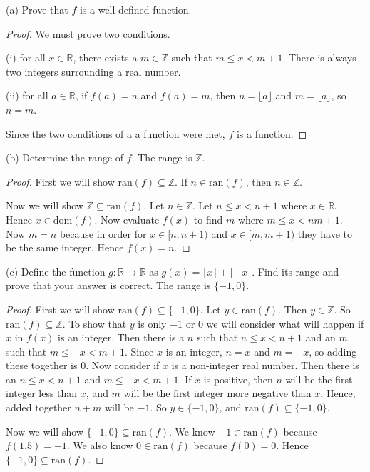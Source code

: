 \documentclass[12pt]{article}
\begin{document}
\begin{enumerate}
		 (a) Prove that $f$ is a well defined function.
		 
		 \begin{proof}
		 	We must prove two conditions.
		 	
		 	(i) for all $x\in\mathbb{R}$, there exists a $m\in\mathbb{Z}$ such that $m\leq x<m+1$. There is always two integers surrounding a real number.
		 	
		 	(ii) for all $a\in\mathbb{R}$, if $f(a)=n$ and $f(a)=m$, then $n=\lfloor a\rfloor$ and $m=\lfloor a\rfloor$, so $n=m$.
		 	
		 	Since the two conditions of a a function were met, $f$ is a function.
		 \end{proof}
	 
	 	\newpage
	 
		(b) Determine the range of $f$.
		The range is $\mathbb{Z}$.
		\begin{proof}
			First we will show $\text{ran}(f)\subseteq\mathbb{Z}$. If $n\in\text{ran}(f)$, then $n\in\mathbb{Z}$.
			
			Now we will show $\mathbb{Z}\subseteq\text{ran}(f)$. Let $n\in\mathbb{Z}$. Let $n\leq x<n+1$ where $x\in\mathbb{R}$. Hence $x\in\text{dom}(f)$. Now evaluate $f(x)$ to find $m$ where $m\leq x<nm+1$. Now $m=n$ because in order for $x\in[n,n+1)$ and $x\in[m,m+1)$ they have to be the same integer. Hence $f(x)=n$.
		\end{proof}
	
		(c) Define the function $g:\mathbb{R}\to\mathbb{R}$ as $g(x)=\lfloor x\rfloor+\lfloor -x\rfloor$. Find its range and prove that your answer is correct.
		The range is $\{-1,0 \}$.
		
		\begin{proof}
			First we will show $\text{ran}(f)\subseteq \{-1,0 \}$. Let $y\in \text{ran}(f)$. Then $y\in\mathbb{Z}$. So $\text{ran}(f)\subseteq\mathbb{Z}$. To show that $y$ is only $-1$ or $0$ we will consider what will happen if $x$ in $f(x)$ is an integer. Then there is a $n$ such that $n\leq x<n+1$ and an $m$ such that $m\leq -x<m+1$. Since $x$ is an integer, $n=x$ and $m=-x$, so adding these together is $0$. Now consider if $x$ is a non-integer real number. Then there is an $n\leq x<n+1$ and $m\leq -x<m+1$. If $x$ is positive, then $n$ will be the first integer less than $x$, and $m$ will be the first integer more negative than $x$. Hence, added together $n+m$ will be $-1$. So $y\in \{-1,0 \}$, and $\text{ran}(f)\subseteq\{-1,0 \}$.
			
			Now we will show $\{-1,0 \}\subseteq\text{ran}(f)$. We know $-1\in\text{ran}(f)$ because $f(1.5)=-1$. We also know $0\in\text{ran}(f)$ because $f(0)=0$. Hence $\{-1,0 \}\subseteq\text{ran}(f)$.
			

\end{proof}
\end{enumerate}
\end{document}
